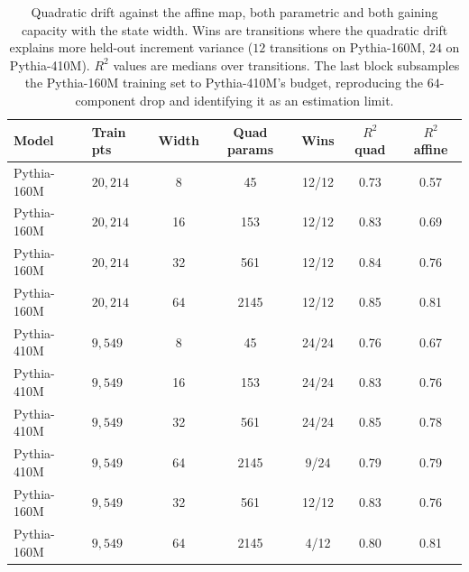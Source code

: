 \documentclass[mlmain]{jmlr}
\begin{document}
\begin{table}[t]
\centering
\caption{Quadratic drift against the affine map, both parametric and both
gaining capacity with the state width. Wins are transitions where the
quadratic drift explains more held-out increment variance ($12$
transitions on Pythia-160M, $24$ on Pythia-410M). $R^2$ values are
medians over transitions. The last block subsamples the Pythia-160M
training set to Pythia-410M's budget, reproducing the $64$-component
drop and identifying it as an estimation limit.}
\label{tab:quad}
\small
\begin{tabular}{llccccc}
\toprule
Model & Train pts & Width & Quad params & Wins & $R^2$ quad & $R^2$ affine \\
\midrule
Pythia-160M & $20{,}214$ & 8 & 45 & 12/12 & 0.73 & 0.57 \\
Pythia-160M & $20{,}214$ & 16 & 153 & 12/12 & 0.83 & 0.69 \\
Pythia-160M & $20{,}214$ & 32 & 561 & 12/12 & 0.84 & 0.76 \\
Pythia-160M & $20{,}214$ & 64 & 2145 & 12/12 & 0.85 & 0.81 \\
\midrule
Pythia-410M & $9{,}549$ & 8 & 45 & 24/24 & 0.76 & 0.67 \\
Pythia-410M & $9{,}549$ & 16 & 153 & 24/24 & 0.83 & 0.76 \\
Pythia-410M & $9{,}549$ & 32 & 561 & 24/24 & 0.85 & 0.78 \\
Pythia-410M & $9{,}549$ & 64 & 2145 & 9/24 & 0.79 & 0.79 \\
\midrule
Pythia-160M & $9{,}549$ & 32 & 561 & 12/12 & 0.83 & 0.76 \\
Pythia-160M & $9{,}549$ & 64 & 2145 & 4/12 & 0.80 & 0.81 \\
\bottomrule
\end{tabular}
\end{table}
\end{document}
